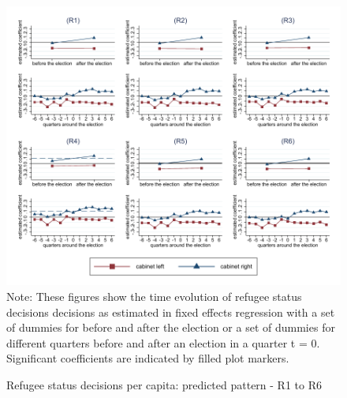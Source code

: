 \documentclass[11pt,a4paper]{scrartcl}
\begin{document}


\clearpage
\FloatBarrier
\begin{figure}[!ht]
	\caption{Refugee status decisions per capita: predicted pattern - R1 to R6}
	\includegraphics[width=1\textwidth]{../results/decisions/log_refugeestatus_pc_graphs_R1-R6.pdf}
	\scriptsize{Note: These figures show the time evolution of refugee status decisions decisions as estimated in fixed effects regression with a set of dummies for before and after the election or a set of dummies for different quarters before and after an election in a quarter t = 0. Significant coefficients are indicated by filled plot markers.}
\end{figure}

\clearpage
\FloatBarrier





\clearpage
\FloatBarrier

\end{document}
